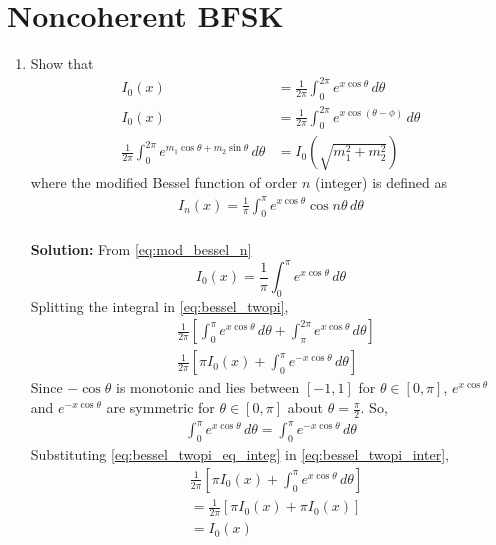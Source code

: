 \documentclass[journal,8pt,onecolumn]{IEEEtran}
\providecommand{\brak}[1]{\ensuremath{\left(#1\right)}}
\newcommand{\solution}{\noindent \textbf{Solution: }}
\begin{document}
\section{Noncoherent BFSK}
\begin{enumerate}
\item
Show that
%
\begin{align}
\label{eq:bessel_twopi}
I_{0}(x) &= \frac{1}{2\pi}\int_{0}^{2\pi}e^{x\cos\theta}\,d\theta \\
\label{eq:bessel_phi}
I_{0}(x) &= \frac{1}{2\pi}\int_{0}^{2\pi}e^{x\cos\brak{\theta-\phi}}\,d\theta \\
\label{eq:bessel_addition}
\frac{1}{2\pi}\int_{0}^{2\pi}e^{m_1\cos\theta + m_2\sin\theta}\,d\theta &= I_0\brak{\sqrt{m_1^2+m_2^2}} 
\end{align}
%
where the modified Bessel function of order $n$ (integer) is defined as 
%
\begin{align}
\label{eq:mod_bessel_n}
I_{n}(x) = \frac{1}{\pi}\int_{0}^{\pi}e^{x\cos\theta}\cos n\theta\,d\theta
\end{align}\\
\solution From \eqref{eq:mod_bessel_n}
\begin{equation}
	I_{0}(x) = \frac{1}{\pi}\int_{0}^{\pi}e^{x\cos\theta} \,d\theta
	\label{eq:mod_bessel_zero}
\end{equation}
Splitting the integral in \eqref{eq:bessel_twopi},
\begin{align}
	& \frac{1}{2\pi}\left[\int_{0}^{\pi}e^{x\cos\theta}\,d\theta+\int_{\pi}^{2\pi}e^{x\cos\theta}\,d\theta\right]\\
	\label{eq:bessel_twopi_inter}
	& \frac{1}{2\pi}\left[\pi I_{0}(x)+\int_{0}^{\pi}e^{-x\cos\theta}\,d\theta\right]
\end{align}
Since $-\cos \theta$ is monotonic and lies between $[-1,1]$ for $\theta \in [0,\pi]$, $e^{x\cos\theta}$ and $e^{-x\cos\theta}$ are symmetric %
for $\theta \in [0,\pi]$ about $\theta = \frac{\pi}{2}$. So,
\begin{align}
	\label{eq:bessel_twopi_eq_integ}
	\int_{0}^{\pi}e^{x\cos\theta}\,d\theta = \int_{0}^{\pi}e^{-x\cos\theta}\,d\theta
\end{align}
Substituting \eqref{eq:bessel_twopi_eq_integ} in \eqref{eq:bessel_twopi_inter},
\begin{align*}
	& \frac{1}{2\pi}\left[\pi I_{0}(x)+\int_{0}^{\pi}e^{x\cos\theta}\,d\theta\right]\\
	&= \frac{1}{2\pi}\left[\pi I_{0}(x)+\pi I_{0}(x)\right]\\
	&= I_{0}(x)

\end{align*}
\end{enumerate}
\end{document}
